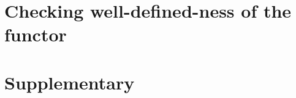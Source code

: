 \documentclass[11pt,reqno]{amsart}
\theoremstyle{definition}
\numberwithin{equation}{section}
\begin{document}
\section{Checking well-defined-ness of the functor}\label{sec well-defined-ness of the functor}

\section{Supplementary}\label{sec supplementary}


 

\end{document}
